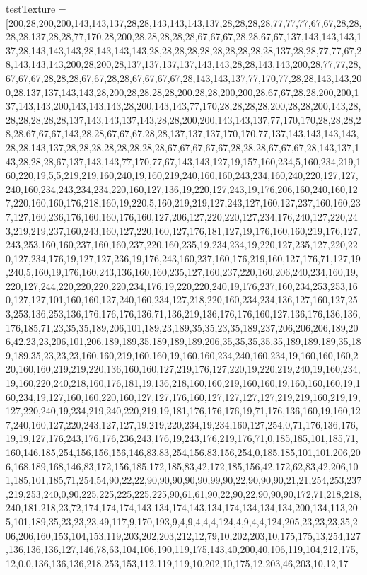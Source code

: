 

testTexture = [200,28,200,200,143,143,137,28,28,143,143,143,137,28,28,28,28,77,77,77,67,67,28,28,28,28,137,28,28,77,170,28,200,28,28,28,28,28,67,67,67,28,28,67,67,137,143,143,143,137,28,143,143,143,28,143,143,143,28,28,28,28,28,28,28,28,28,28,137,28,28,77,77,67,28,143,143,143,200,28,200,28,137,137,137,137,143,143,28,28,143,143,200,28,77,77,28,67,67,67,28,28,28,67,67,28,28,67,67,67,67,28,143,143,137,77,170,77,28,28,143,143,200,28,137,137,143,143,28,200,28,28,28,28,200,28,28,200,200,28,67,67,28,28,200,200,137,143,143,200,143,143,143,28,200,143,143,77,170,28,28,28,28,200,28,28,200,143,28,28,28,28,28,28,137,143,143,137,143,28,28,200,200,143,143,137,77,170,170,28,28,28,28,28,67,67,67,143,28,28,67,67,67,28,28,137,137,137,170,170,77,137,143,143,143,143,28,28,143,137,28,28,28,28,28,28,28,28,67,67,67,67,67,28,28,28,67,67,67,28,143,137,143,28,28,28,67,137,143,143,77,170,77,67,143,143,127,19,157,160,234,5,160,234,219,160,220,19,5,5,219,219,160,240,19,160,219,240,160,160,243,234,160,240,220,127,127,240,160,234,243,234,234,220,160,127,136,19,220,127,243,19,176,206,160,240,160,127,220,160,160,176,218,160,19,220,5,160,219,219,127,243,127,160,127,237,160,160,237,127,160,236,176,160,160,176,160,127,206,127,220,220,127,234,176,240,127,220,243,219,219,237,160,243,160,127,220,160,127,176,181,127,19,176,160,160,219,176,127,243,253,160,160,237,160,160,237,220,160,235,19,234,234,19,220,127,235,127,220,220,127,234,176,19,127,127,236,19,176,243,160,237,160,176,219,160,127,176,71,127,19,240,5,160,19,176,160,243,136,160,160,235,127,160,237,220,160,206,240,234,160,19,220,127,244,220,220,220,220,234,176,19,220,220,240,19,176,237,160,234,253,253,160,127,127,101,160,160,127,240,160,234,127,218,220,160,234,234,136,127,160,127,253,253,136,253,136,176,176,176,136,71,136,219,136,176,176,160,127,136,176,136,136,176,185,71,23,35,35,189,206,101,189,23,189,35,35,23,35,189,237,206,206,206,189,206,42,23,23,206,101,206,189,189,35,189,189,189,206,35,35,35,35,35,189,189,189,35,189,189,35,23,23,23,160,160,219,160,160,19,160,160,234,240,160,234,19,160,160,160,220,160,160,219,219,220,136,160,160,127,219,176,127,220,19,220,219,240,19,160,234,19,160,220,240,218,160,176,181,19,136,218,160,160,219,160,160,19,160,160,160,19,160,234,19,127,160,160,220,160,127,127,176,160,127,127,127,127,219,219,160,219,19,127,220,240,19,234,219,240,220,219,19,181,176,176,176,19,71,176,136,160,19,160,127,240,160,127,220,243,127,127,19,219,220,234,19,234,160,127,254,0,71,176,136,176,19,19,127,176,243,176,176,236,243,176,19,243,176,219,176,71,0,185,185,101,185,71,160,146,185,254,156,156,156,146,83,83,254,156,83,156,254,0,185,185,101,101,206,206,168,189,168,146,83,172,156,185,172,185,83,42,172,185,156,42,172,62,83,42,206,101,185,101,185,71,254,54,90,22,22,90,90,90,90,90,99,90,22,90,90,90,21,21,254,253,237,219,253,240,0,90,225,225,225,225,225,90,61,61,90,22,90,22,90,90,90,172,71,218,218,240,181,218,23,72,174,174,174,143,134,174,143,134,174,134,134,134,200,134,113,205,101,189,35,23,23,23,49,117,9,170,193,9,4,9,4,4,4,124,4,9,4,4,124,205,23,23,23,35,206,206,160,153,104,153,119,203,202,203,212,12,79,10,202,203,10,175,175,13,254,127,136,136,136,127,146,78,63,104,106,190,119,175,143,40,200,40,106,119,104,212,175,12,0,0,136,136,136,218,253,153,112,119,119,10,202,10,175,12,203,46,203,10,12,17